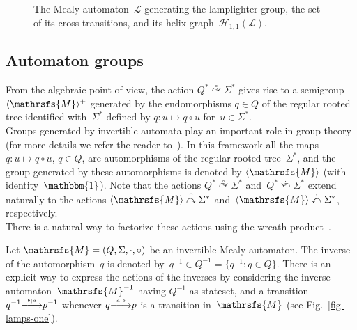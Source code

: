 \documentclass{amsart}
\begin{document}
\begin{figure}[ht]
\begin{subfigure}[t]{0.32\textwidth}
\end{subfigure}
\caption{The Mealy automaton~${{\mathcal{L}}}$ generating the lamplighter group, the set of its cross-transitions,
and its helix graph~${\mathcal{H}}_{1,1}({{\mathcal{L}}})$.}
\label{fig-lamps-two}\end{figure}

\subsection{Automaton groups}
From the algebraic point of view, the action
${{{Q}}}^{*}\overset{{{\circ}}}{\curvearrowright} {{{\Sigma}}}^{*}$ gives rise to a
semigroup ${\hbox{$\langle{{{\mathrsfs{{M}}}}}\rangle^+$}}$ generated by the endomorphisms
$q\in {{{Q}}}$ of the  regular rooted tree identified with~${{{\Sigma}}}^{*}$ defined by
$q: u\mapsto q{{{\circ}}} u$ for~$u\in {{{\Sigma}}}^{*}$.\\
Groups generated by invertible automata play an  important role in group theory (for more
details we refer the reader to~\cite{Nekra05}). In this
framework all the maps~$q: u\mapsto q{{{\circ}}} u$, $q\in {{{Q}}}$, are automorphisms
of the  regular rooted tree~${{{\Sigma}}}^{*}$, and the group generated by these
automorphisms is denoted by ${{{\langle}{{\mathrsfs{{{M}}}}}{\rangle}}}$ (with identity~$\operatorname{\mathbbm{1}}$).
Note that the actions ${{{Q}}}^{*}\overset{{{\circ}}}{\curvearrowright} {{{\Sigma}}}^{*}$
and~${{{Q}}}^{*}\overset{{{\cdot}}}{\curvearrowleft} {{{\Sigma}}}^{*}$ extend naturally
to the actions ${{{\langle}{{\mathrsfs{{{M}}}}}{\rangle}}}\overset{{{\circ}}}{\curvearrowright} {{{\Sigma}}}^{*}$
and~${{{\langle}{{\mathrsfs{{{M}}}}}{\rangle}}}\overset{{{\cdot}}}{\curvearrowleft} {{{\Sigma}}}^{*}$, respectively.\\
There is a natural way to factorize these actions using the wreath product~\cite{Nekra05,BarSil}.
\medskip

Let ${{{\mathrsfs{{M}}}}}=({{{Q}}},{{{\Sigma}}},{{{\cdot}}},{{{\circ}}})$ be an invertible Mealy automaton. The inverse of the automorphism~$q$ is
denoted by~$q^{-1}\in {{{Q}}}^{-1}=\{q^{-1}:q\in {{{Q}}}\}$. There is an explicit
way to express the actions of the inverses by considering
the inverse automaton~${{{\mathrsfs{{M}}}}}^{-1}$ having ${{{Q}}}^{-1}$ as stateset,
and a transition $q^{-1}{\smash{\stackrel{\text{\tiny{${b|a}$}}}{\relbar\joinrel\longrightarrow}}}p^{-1}$  whenever $q{\smash{\stackrel{\text{\tiny{${a|b}$}}}{\relbar\joinrel\longrightarrow}}}p$ is a transition in~${{{\mathrsfs{{M}}}}}$ (see Fig.~\ref{fig-lamps-one}).
\end{document}
